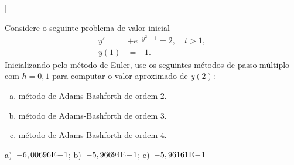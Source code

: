 \begin{flushleft}
  [[tag:revisar]]
\end{flushleft}

\begin{exer}
  Considere o seguinte problema de valor inicial
  \begin{align}
    y' &+ e^{-y^2+1} = 2,\quad t>1,\\
    y(1) &= -1.
  \end{align}
Inicializando pelo método de Euler, use os seguintes métodos de passo múltiplo com $h=0,1$ para computar o valor aproximado de $y(2)$:
\begin{enumerate}[a)]
\item método de Adams-Bashforth de ordem $2$.
\item método de Adams-Bashforth de ordem $3$.
\item método de Adams-Bashforth de ordem $4$.
\end{enumerate}
\end{exer}
\begin{resp}
  a)~$-6,00696\mathrm{E}\!-\!1$; b)~$-5,96694\mathrm{E}\!-\!1$; c)~$-5,96161\mathrm{E}\!-\!1$
\end{resp}
